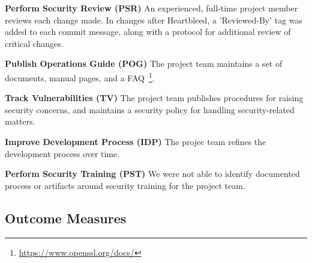 \textbf{Perform Security Review (PSR)}
An experienced, full-time project member reviews each change made. In changes after Heartbleed, a 'Reviewed-By' tag was added to each commit message, along with a protocol for additional review of critical changes.

\textbf{Publish Operations Guide (POG)}
The project team maintains a set of documents, manual pages, and a FAQ~\footnote{\url{https://www.openssl.org/docs/}}.

\textbf{Track Vulnerabilities (TV)}
The project team publishes procedures for raising security concerns, and maintains a security policy for handling security-related matters. 

\textbf{Improve Development Process (IDP)}
The projec team refines the development process over time.

\textbf{Perform Security Training (PST)} 
We were not able to identify documented process or artifacts around security training for the project team.


%

\subsection{Outcome Measures}